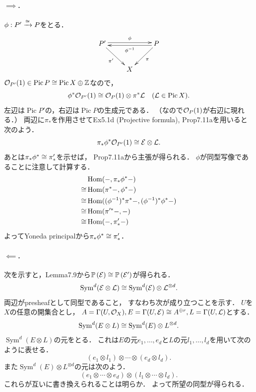 \documentclass[a4paper]{jsarticle}
\newcommand{\Pic}{\operatorname{Pic}}
\newcommand{\Sym}{\operatorname{Sym}}
\newcommand{\pbundle}{\mathbb{P}\,}
\begin{document}
    \paragraph{$\implies$.}
    $\phi: P' \xrightarrow{\cong} P$をとる．
    \[
        \xymatrix
        {
            P' \ar@<2pt>[rr]^-{\phi}\ar[rd]_-{\pi'}& {} &\ar@<2pt>[ll]^-{\phi^{-1}} P \ar[ld]^-{\pi} \\
            {} & X & {}
        }
    \]
    $\shO_{P'}(1) \in \Pic P \iso \Pic X \oplus \Z$なので，
    \[ \phi^* \shO_{P'}(1) \iso \shO_P(1) \otimes \pi^* \shL ~~~(\shL \in \Pic X). \]
    左辺は$\Pic P'$の，右辺は$\Pic P$の生成元である．
    （なので$\mathcal{O}_P(1)$が右辺に現れる．）
    両辺に$\pi_*$を作用させてEx5.1d (Projective formula), Prop7.11aを用いると次のよう．
    \[ \pi_*\phi^* \mathcal{O}_{P'}(1) \cong \mathcal{E} \otimes \mathcal{L}. \]
    あとは$\pi_* \phi^* \cong \pi'_*$を示せば，
    Prop7.11aから主張が得られる．
    $\phi$が同型写像であることに注意して計算する．
    \begin{align*}
        {}&     \operatorname{Hom}(-, \pi_* \phi^* -) \\
        \cong&   \operatorname{Hom}(\pi^* -, \phi^* -) \\
        \cong&   \operatorname{Hom}((\phi^{-1})^*\pi^* -, (\phi^{-1})^*\phi^* -) \\
        \cong&   \operatorname{Hom}(\pi'^* -, -) \\
        \cong&   \operatorname{Hom}(-, \pi'_* -)
    \end{align*}
    よってYoneda principalから$\pi_* \phi^* \cong \pi'_*$．

    \paragraph{$\impliedby$.}
    次を示すと，Lemma7.9から$\pbundle(\shE) \iso \pbundle(\shE')$が得られる．
    \[ \Sym^d(\shE \otimes \shL) \iso \Sym^d(\shE) \otimes \shL^{\otimes d}. \]
    両辺がpresheafとして同型であること，
    すなわち次が成り立つことを示す．
    $U$を$X$の任意の開集合とし，
    $A=\Gamma(U, \mathcal{O}_X), E=\Gamma(U, \mathcal{E}) \cong A^{\oplus r}, L=\Gamma(U, \mathcal{L})$とする．
    \[ \Sym^d(E \otimes L) \iso \Sym^d(E) \otimes L^{\otimes d}. \]
    $\Sym^d(E \otimes L)$の元をとる．
    これは$E$の元$e_1,\dots,e_d$と$L$の元$l_1,\dots,l_d$を用いて次のように表せる．
    \[ (e_1 \otimes l_1) \otimes \cdots \otimes (e_d \otimes l_d). \]
    また$\Sym^d(E) \otimes L^{\otimes d}$の元は次のよう．
    \[ (e_1 \otimes \cdots \otimes e_d) \otimes (l_1 \otimes \cdots \otimes l_d). \]
    これらが互いに書き換えられることは明らか．
    よって所望の同型が得られる．
\end{document}
